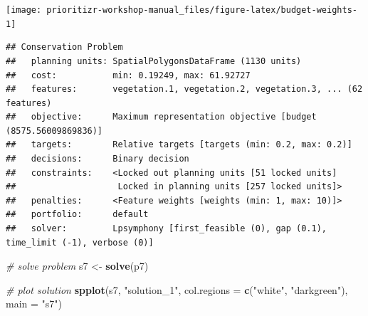 \documentclass[12pt,]{book}
\newenvironment{Shaded}{\begin{snugshade}}{\end{snugshade}}
\newcommand{\KeywordTok}[1]{\textcolor[rgb]{0.13,0.29,0.53}{\textbf{#1}}}
\newcommand{\DataTypeTok}[1]{\textcolor[rgb]{0.13,0.29,0.53}{#1}}
\newcommand{\FloatTok}[1]{\textcolor[rgb]{0.00,0.00,0.81}{#1}}
\newcommand{\StringTok}[1]{\textcolor[rgb]{0.31,0.60,0.02}{#1}}
\newcommand{\CommentTok}[1]{\textcolor[rgb]{0.56,0.35,0.01}{\textit{#1}}}
\newcommand{\OtherTok}[1]{\textcolor[rgb]{0.56,0.35,0.01}{#1}}
\newcommand{\OperatorTok}[1]{\textcolor[rgb]{0.81,0.36,0.00}{\textbf{#1}}}
\newcommand{\NormalTok}[1]{#1}
\begin{document}
\begin{center}\texttt{[image: prioritizr-workshop-manual\_files/figure-latex/budget-weights-1]} \end{center}

\begin{Shaded}
\end{Shaded}

\begin{verbatim}
## Conservation Problem
##   planning units: SpatialPolygonsDataFrame (1130 units)
##   cost:           min: 0.19249, max: 61.92727
##   features:       vegetation.1, vegetation.2, vegetation.3, ... (62 features)
##   objective:      Maximum representation objective [budget (8575.56009869836)]
##   targets:        Relative targets [targets (min: 0.2, max: 0.2)]
##   decisions:      Binary decision 
##   constraints:    <Locked out planning units [51 locked units]
##                    Locked in planning units [257 locked units]>
##   penalties:      <Feature weights [weights (min: 1, max: 10)]>
##   portfolio:      default
##   solver:         Lpsymphony [first_feasible (0), gap (0.1), time_limit (-1), verbose (0)]
\end{verbatim}

\begin{Shaded}
\begin{Highlighting}[]
\CommentTok{# solve problem}
\NormalTok{s7 <-}\StringTok{ }\KeywordTok{solve}\NormalTok{(p7)}

\CommentTok{# plot solution}
\KeywordTok{spplot}\NormalTok{(s7, }\StringTok{"solution_1"}\NormalTok{, }\DataTypeTok{col.regions =} \KeywordTok{c}\NormalTok{(}\StringTok{"white"}\NormalTok{, }\StringTok{"darkgreen"}\NormalTok{), }\DataTypeTok{main =} \StringTok{"s7"}\NormalTok{)}
\end{Highlighting}
\end{Shaded}
\end{document}
